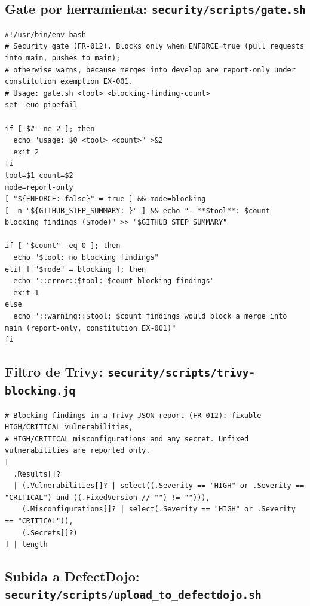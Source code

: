 \subsection{Gate por herramienta: \texttt{security/scripts/gate.sh}}
\label{anx:gate}

\begin{lstlisting}
#!/usr/bin/env bash
# Security gate (FR-012). Blocks only when ENFORCE=true (pull requests into main, pushes to main);
# otherwise warns, because merges into develop are report-only under constitution exemption EX-001.
# Usage: gate.sh <tool> <blocking-finding-count>
set -euo pipefail

if [ $# -ne 2 ]; then
  echo "usage: $0 <tool> <count>" >&2
  exit 2
fi
tool=$1 count=$2
mode=report-only
[ "${ENFORCE:-false}" = true ] && mode=blocking
[ -n "${GITHUB_STEP_SUMMARY:-}" ] && echo "- **$tool**: $count blocking findings ($mode)" >> "$GITHUB_STEP_SUMMARY"

if [ "$count" -eq 0 ]; then
  echo "$tool: no blocking findings"
elif [ "$mode" = blocking ]; then
  echo "::error::$tool: $count blocking findings"
  exit 1
else
  echo "::warning::$tool: $count findings would block a merge into main (report-only, constitution EX-001)"
fi
\end{lstlisting}

\subsection{Filtro de Trivy: \texttt{security/scripts/trivy-blocking.jq}}
\label{anx:jq}

\begin{lstlisting}
# Blocking findings in a Trivy JSON report (FR-012): fixable HIGH/CRITICAL vulnerabilities,
# HIGH/CRITICAL misconfigurations and any secret. Unfixed vulnerabilities are reported only.
[
  .Results[]?
  | (.Vulnerabilities[]? | select((.Severity == "HIGH" or .Severity == "CRITICAL") and ((.FixedVersion // "") != ""))),
    (.Misconfigurations[]? | select(.Severity == "HIGH" or .Severity == "CRITICAL")),
    (.Secrets[]?)
] | length
\end{lstlisting}

\subsection{Subida a DefectDojo: \texttt{security/scripts/upload\_to\_defectdojo.sh}}
\label{anx:upload}

